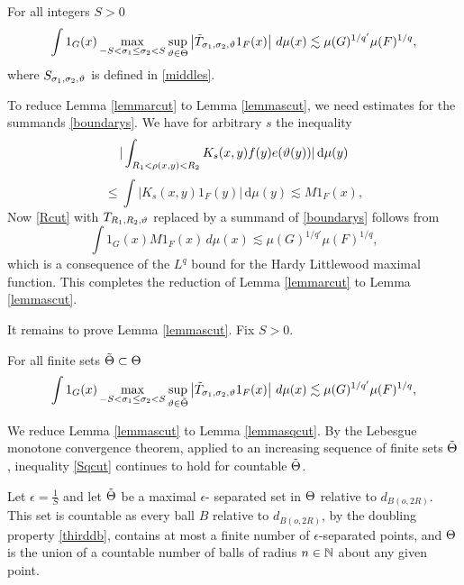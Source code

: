 \begin{lemma}\label{lemmascut}
For all integers $S>0$
    \begin{equation} \label{Scut}
    \int 1_{G}(x)
\max_{-S<\sigma_1\le \sigma_2<S}\sup_{\vartheta\in\Theta}
\left| \Tilde{T}_{\sigma_1,\sigma_2,\vartheta} 1_{F}(x) \right|\, d\mu(x)
\lesssim \mu(G)^{1/q'} \mu(F)^{1/q},
\end{equation}
where $S_{\sigma_1,\sigma_2,\vartheta}$ is defined in \eqref{middles}.
\end{lemma}

To reduce Lemma \ref{lemmarcut} to Lemma \ref{lemmascut},  we need estimates for the summands  \eqref{boundarys}. We have for arbitrary $s$ the inequality
\begin{equation}\label{HLbound}
|\int_{R_1 <  \rho(x,y) < R_2}  K_s(x,y) f(y) e(\vartheta(y))| \,  \mathrm{d}\mu(y)
\end{equation}
\begin{equation}\label{HLbound2}
\le \int   |K_s(x,y) 1_F(y)| \,  \mathrm{d}\mu(y)
\lesssim M1_F(x),
\end{equation}
Now \eqref{Rcut} with $T_{R_1,R_2,\vartheta}$ replaced by a summand of \eqref{boundarys}
follows from
    \begin{equation}
    \int 1_{G}(x) M1_F(x)\, d\mu(x)
\lesssim \mu(G)^{1/q'} \mu(F)^{1/q},
\end{equation}
which is a consequence of
the $L^q$ bound for the Hardy Littlewood maximal function. This completes the reduction of
Lemma \ref{lemmarcut} to Lemma \ref{lemmascut}.


It remains to prove Lemma \ref{lemmascut}. Fix $S>0$.

\begin{lemma}\label{lemmasqcut}
For all finite sets $\tilde{\Theta}\subset \Theta$
    \begin{equation} \label{Sqcut}
    \int 1_{G}(x)
\max_{-S<\sigma_1\le \sigma_2<S}\sup_{\vartheta\in\tilde{\Theta}}
\left| \Tilde{T}_{\sigma_1,\sigma_2,\vartheta} 1_{F}(x) \right|\, d\mu(x)
\lesssim \mu(G)^{1/q'} \mu(F)^{1/q},
\end{equation}
\end{lemma}

We reduce Lemma \ref{lemmascut} to Lemma \ref{lemmasqcut}.
By the Lebesgue monotone convergence theorem,
applied to an increasing sequence of finite sets $\tilde{\Theta}$, inequality \eqref{Sqcut}
continues to hold for  countable $\tilde{\Theta}$.

Let $\epsilon=\frac 1S$ and let $\tilde{\Theta}$ be a maximal $\epsilon$- separated set in $\Theta$ relative to $d_{B(o,2R)}$. This set is countable as  every ball $B$ relative to $d_{B(o,2R)}$, by the doubling property \eqref{thirddb},
contains at most a finite number of $\epsilon$-separated points, and $\Theta$ is the union of a countable number of balls of radius $n\in \mathbb{N}$ about any given point.



